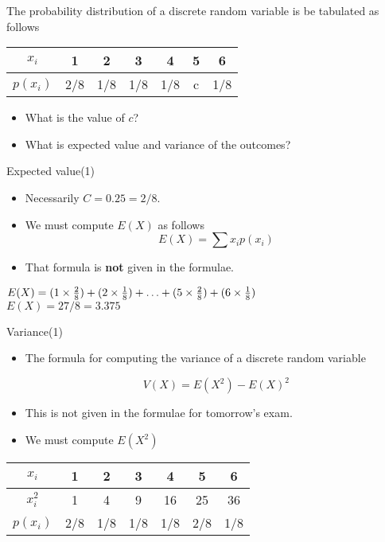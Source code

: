 {{{{{{{	The probability distribution of a discrete random variable is be tabulated as follows
	
	\begin{center}
		\begin{tabular}{|c||c|c|c|c|c|c|}
			\hline
			$x_i$  & 1 & 2 & 3 & 4 & 5 & 6 \\\hline
			$p(x_i)$ & 2/8 & 1/8& 1/8 & 1/8& c & 1/8\\
			\hline
		\end{tabular}
	\end{center}
	
	\begin{itemize}
		\item What is the value of $c$?
		\item What is expected value and variance of the outcomes?
	\end{itemize}
}
{
	{Expected value(1)}
	\begin{itemize}
		\item Necessarily $C =0.25 = 2/8$. \\
		\item We must compute $E(X)$ as follows \[E(X) = \sum x_i p(x_i) \]
		\item That formula is \textbf{not} given in the formulae.
	\end{itemize}
	\bigskip
	$E(X) = (1 \times {2\over8}) + (2 \times {1 \over 8}) +  \ldots + (5 \times {2 \over 8}) + (6 \times {1 \over 8})$\\\bigskip
	$E(X) = 27/8 = 3.375$\bigskip
}
{
	{Variance(1)}
	\begin{itemize}
		\item The formula for computing the variance of a discrete random variable
		
		\[ V(X) = E(X^2) - E(X)^2 \]
		
		\item This is not given in the formulae for tomorrow's exam.
		
		\item We must compute $E(X^2)$
	\end{itemize}
	
	\begin{center}
		\begin{tabular}{|c||c|c|c|c|c|c|}
			\hline
			$x_i$  & 1 & 2 & 3 & 4 & 5 & 6 \\\hline
			$x^2_i$  & 1 & 4 & 9 & 16 & 25 & 36 \\\hline
			$p(x_i)$ & 2/8 & 1/8& 1/8 & 1/8& 2/8 & 1/8\\
			\hline
		\end{tabular}
	\end{center}
}
{

}}}}}}}
